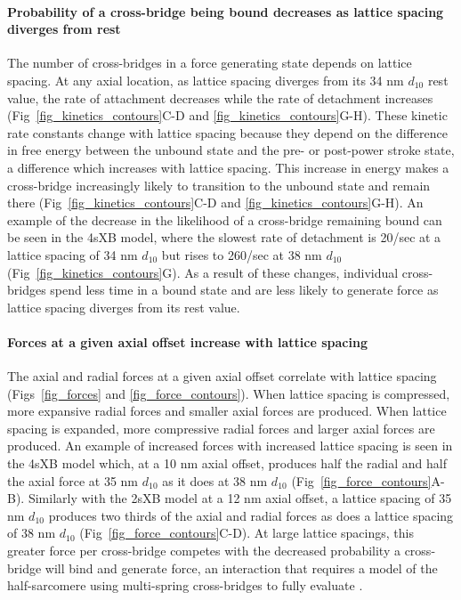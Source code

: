 \documentclass[10pt]{article}
\newcommand{\citep}[1]{\cite{#1}} %
\begin{document}
\paragraph{Probability of a cross-bridge being bound decreases as lattice spacing diverges from rest} %
The number of cross-bridges in a force generating state depends on lattice spacing. 
At any axial location, as lattice spacing diverges from its 34 nm $d_{10}$ rest value, the rate of attachment decreases while the rate of detachment increases (Fig~\ref{fig_kinetics_contours}C-D and \ref{fig_kinetics_contours}G-H). 
These kinetic rate constants change with lattice spacing because they depend on the difference in free energy between the unbound state and the pre- or post-power stroke state, a difference which increases with lattice spacing.
This increase in energy makes a cross-bridge increasingly likely to transition to the unbound state and remain there (Fig~\ref{fig_kinetics_contours}C-D and  \ref{fig_kinetics_contours}G-H). 
An example of the decrease in the likelihood of a cross-bridge remaining bound can be seen in the 4sXB model, where the slowest rate of detachment is 20/sec at a lattice spacing of 34 nm $d_{10}$ but rises to 260/sec at 38 nm $d_{10}$ (Fig~\ref{fig_kinetics_contours}G). 
As a result of these changes, individual cross-bridges spend less time in a bound state and are less likely to generate force as lattice spacing diverges from its rest value.

\paragraph{Forces at a given axial offset increase with lattice spacing} %
The axial and radial forces at a given axial offset correlate with lattice spacing (Figs~\ref{fig_forces} and \ref{fig_force_contours}).
When lattice spacing is compressed, more expansive radial forces and smaller axial forces are produced. 
When lattice spacing is expanded, more compressive radial forces and larger axial forces are produced. 
An example of increased forces with increased lattice spacing is seen in the 4sXB model which, at a 10 nm axial offset, produces half the radial and half the axial force at 35 nm $d_{10}$ as it does at 38 nm $d_{10}$ (Fig~\ref{fig_force_contours}A-B). 
Similarly with the 2sXB model at a 12 nm axial offset, a lattice spacing of 35 nm $d_{10}$ produces two thirds of the axial and radial forces as does a lattice spacing of 38 nm $d_{10}$ (Fig~\ref{fig_force_contours}C-D).
At large lattice spacings, this greater force per cross-bridge competes with the decreased probability a cross-bridge will bind and generate force, an interaction that requires a model of the half-sarcomere using multi-spring cross-bridges to fully evaluate \citep{Martyn2004}. 
\end{document}

